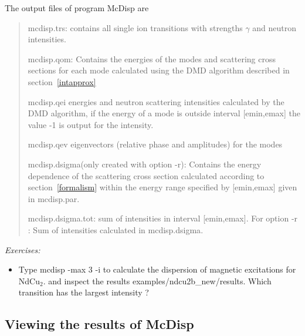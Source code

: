 The output files of program {\prg McDisp} are 

\begin{quote}
\item[{\prg mcdisp.trs}:] contains all single ion transitions with strengths $\gamma$ 
and neutron intensities.
\item [{\prg mcdisp.qom}:] Contains the energies of the modes and scattering cross sections  for each mode 
calculated using the DMD algorithm described in section~\ref{intapprox}
\item[{\prg mcdisp.qei}] energies and neutron scattering intensities calculated by the DMD algorithm, if 
        the energy of a mode is outside interval  [emin,emax] the value -1 is output for the intensity.
\item[{\prg mcdisp.qev}] eigenvectors (relative phase and amplitudes) for the modes
\item [{\prg mcdisp.dsigma}(only created with option {\prg -r}):] Contains the energy dependence of the scattering cross %
section
calculated according to section~\ref{formalism} within the energy range specified by [emin,emax] given in {\prg %
mcdisp.par}. 
\item [{\prg mcdisp.dsigma.tot}:] sum of intensities in interval  [emin,emax].  For option {\prg -r} : Sum of intensities calculated in {\prg %
mcdisp.dsigma}.
\end{quote}

\vspace{1cm}
{\em Exercises:}
\begin{itemize}
\item Type {\prg mcdisp -max 3 -i} to
calculate the dispersion of magnetic excitations for NdCu$_2$.
and inspect the results
{\prg examples/ndcu2b\_new/results}.
Which  transition has the largest intensity ?
\end{itemize}

\subsection{Viewing the results of McDisp}

